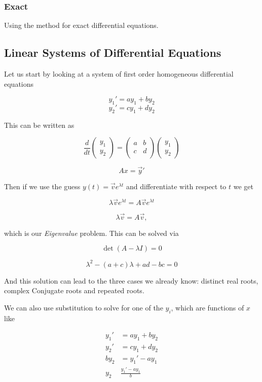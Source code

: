 \subsubsection{Exact}

Using the method for exact differential equations.

\subsection{Linear Systems of Differential Equations}

Let us start by looking at a system of first order homogeneous differential equations

\[
    y_1 ' = ay_1 + by_2
\]
\[
    y_2 ' = cy_1 + dy_2
\]

This can be written as 

\[
    \frac{d}{dt} 
    \begin{pmatrix} 
    y_1 \\ 
    y_2 
    \end{pmatrix} 
    = 
    \begin{pmatrix}
    a & b \\
    c & d \\
    \end{pmatrix} 
    \begin{pmatrix}
    y_1 \\ 
    y_2
    \end{pmatrix}
\]

\[
    Ax = \vec{y}'
\]

Then if we use the guess \(y(t) = \vec{v} e^{\lambda t}\) and differentiate with respect to \(t\) 
we get 

\[
    \lambda \vec{v} e^{\lambda t} = A \vec{v} e^{\lambda t}
\]

\[
    \lambda \vec{v} = A \vec{v},
\]

which is our \emph{Eigenvalue} problem. This can be solved via

\[
    \det(A - \lambda I) = 0
\]

\[
    \lambda^{2} - (a + c)\lambda + ad - bc = 0
\]

And this solution can lead to the three cases we already know: distinct real roots, complex Conjugate 
roots and repeated roots.
\vspace{\baselineskip}

We can also use substitution to solve for one of the \(y_i\), which are functions of \(x\) like

\begin{align*}
    y_1 ' &= ay_1 + by_2\\
    y_2 ' &= cy_1 + dy_2\\
    by_2 &= y_1' - ay_1\\
    y_2 & \frac{y_1' - ay_1}{b}
\end{align*}


